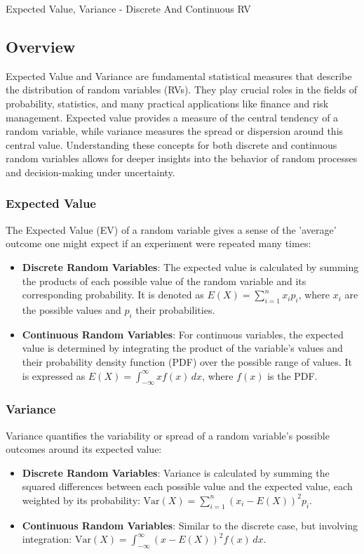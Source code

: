 \begin{notes}{Expected Value, Variance - Discrete And Continuous RV}
    \subsection*{Overview}

    Expected Value and Variance are fundamental statistical measures that describe the distribution of random variables (RVs). They play crucial roles in the fields of probability, statistics, and 
    many practical applications like finance and risk management. Expected value provides a measure of the central tendency of a random variable, while variance measures the spread or dispersion 
    around this central value. Understanding these concepts for both discrete and continuous random variables allows for deeper insights into the behavior of random processes and decision-making 
    under uncertainty. \vspace*{1em}
    
    \subsubsection*{Expected Value}
    
    The Expected Value (EV) of a random variable gives a sense of the 'average' outcome one might expect if an experiment were repeated many times:
    \begin{itemize}
        \item \textbf{Discrete Random Variables}: The expected value is calculated by summing the products of each possible value of the random variable and its corresponding probability. It is denoted 
        as $E(X) = \sum_{i=1}^n x_i p_i$, where $x_i$ are the possible values and $p_i$ their probabilities.
        \item \textbf{Continuous Random Variables}: For continuous variables, the expected value is determined by integrating the product of the variable's values and their probability density function 
        (PDF) over the possible range of values. It is expressed as $E(X) = \int_{-\infty}^{\infty} x f(x) \, dx$, where $f(x)$ is the PDF.
    \end{itemize}
    
    \subsubsection*{Variance}
    
    Variance quantifies the variability or spread of a random variable's possible outcomes around its expected value:
    \begin{itemize}
        \item \textbf{Discrete Random Variables}: Variance is calculated by summing the squared differences between each possible value and the expected value, each weighted by its probability: $\text{Var}(X) = \sum_{i=1}^n (x_i - E(X))^2 p_i$.
        \item \textbf{Continuous Random Variables}: Similar to the discrete case, but involving integration: $\text{Var}(X) = \int_{-\infty}^{\infty} (x - E(X))^2 f(x) \, dx$.
    \end{itemize}
    

\end{notes}
